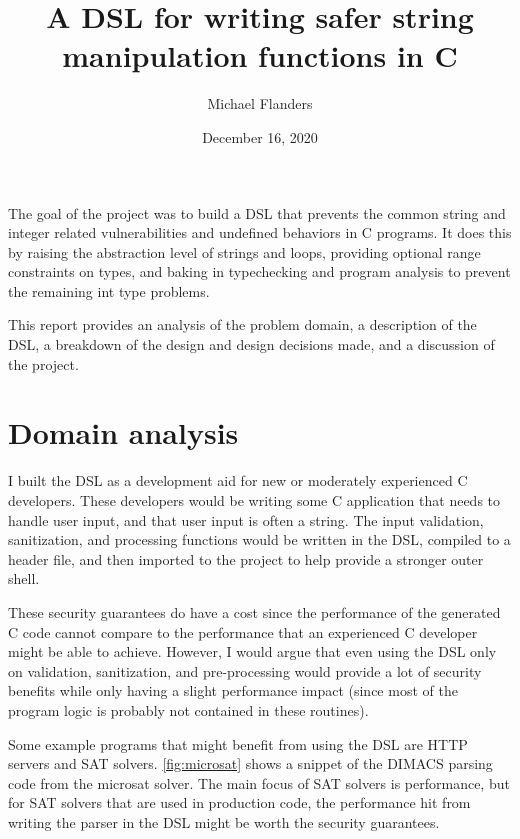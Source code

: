 \documentclass[letterpaper]{article}
\title{A DSL for writing safer string manipulation functions in C}
\author{Michael Flanders}
\date{December 16, 2020}
\begin{document}
\maketitle


The goal of the project was to build a DSL that prevents the common
string and integer related vulnerabilities and undefined behaviors
in C programs. It does this by raising the abstraction level of
strings and loops, providing optional range constraints on types,
and baking in typechecking and program analysis to prevent the
remaining int type problems.

This report provides an analysis of the problem domain, a description
of the DSL, a breakdown of the design and design decisions made, and
a discussion of the project.

\section{Domain analysis}

I built the DSL as a development aid for new or moderately experienced
C developers. These developers would be writing some C application
that needs to handle user input, and that user input is often a string.
The input validation, sanitization, and processing functions would be
written in the DSL, compiled to a header file, and then imported to
the project to help provide a stronger outer shell.

These security guarantees do have a cost since the performance of the
generated C code cannot compare to the performance that an experienced
C developer might be able to achieve. However, I would argue that even
using the DSL only on validation, sanitization, and pre-processing would
provide a lot of security benefits while only having a slight performance
impact (since most of the program logic is probably not contained in these
routines).

Some example programs that might benefit from using the DSL are HTTP
servers and SAT solvers. \ref{fig:microsat} shows a snippet of the
DIMACS parsing code from the microsat solver. The main focus of SAT
solvers is performance, but for SAT solvers that are used in production
code, the performance hit from writing the parser in the DSL might
be worth the security guarantees. 
\end{document}
